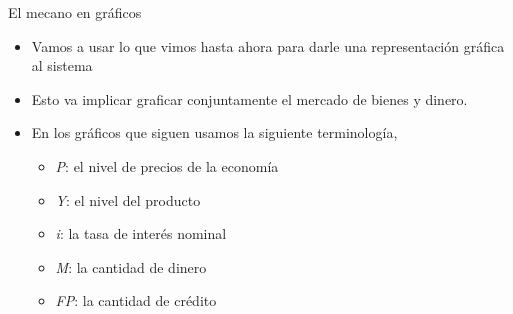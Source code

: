 \documentclass{beamer}
\begin{document}
\begin{frame}{El mecano en gráficos}

\begin{itemize}
    \item Vamos a usar lo que vimos hasta ahora para darle una representación gráfica al sistema 
    \item Esto va implicar graficar conjuntamente el mercado de bienes y dinero.
    \item En los gráficos que siguen usamos la siguiente terminología, 
    \begin{itemize}
        \item \textit{P}: el nivel de precios de la economía
        \item \textit{Y}: el nivel del producto
        \item \textit{i}: la tasa de interés nominal
        \item \textit{M}: la cantidad de dinero
        \item \textit{FP}: la cantidad de crédito
    \end{itemize}
\end{itemize}

\end{frame}
\end{document}
